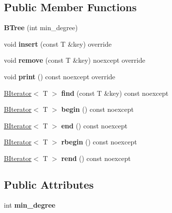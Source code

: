 \subsection*{Public Member Functions}
\begin{DoxyCompactItemize}
\item 
\mbox{\label{classBTree_a16c152bc0c234a02359d259c5dd1d959}} 
{\bfseries B\+Tree} (int min\+\_\+degree)
\item 
\mbox{\label{classBTree_a6b821651c388e302d1fb43551bb67232}} 
void {\bfseries insert} (const T \&key) override
\item 
\mbox{\label{classBTree_aef3581a1c5e11ac1c037d66a27cbcb94}} 
void {\bfseries remove} (const T \&key) noexcept override
\item 
\mbox{\label{classBTree_a4f31693f9077aad3266b7f13625b9ede}} 
void {\bfseries print} () const noexcept override
\item 
\mbox{\label{classBTree_ac0fac7271e38a543aff042db79be9c36}} 
\hyperlink{classBIterator}{B\+Iterator}$<$ T $>$ {\bfseries find} (const T \&key) const noexcept
\item 
\mbox{\label{classBTree_aae48f3719f14f2170641cf204a9d531c}} 
\hyperlink{classBIterator}{B\+Iterator}$<$ T $>$ {\bfseries begin} () const noexcept
\item 
\mbox{\label{classBTree_a3115f4378da1a0fd49e73a5dbecf9822}} 
\hyperlink{classBIterator}{B\+Iterator}$<$ T $>$ {\bfseries end} () const noexcept
\item 
\mbox{\label{classBTree_a3a24bc55b80013d9fcd57d5589aad413}} 
\hyperlink{classBIterator}{B\+Iterator}$<$ T $>$ {\bfseries rbegin} () const noexcept
\item 
\mbox{\label{classBTree_af024f4b5201a49115da494161d4dcbce}} 
\hyperlink{classBIterator}{B\+Iterator}$<$ T $>$ {\bfseries rend} () const noexcept
\end{DoxyCompactItemize}
\subsection*{Public Attributes}
\begin{DoxyCompactItemize}
\item 
\mbox{\label{classBTree_a67674b9ddf809c4f518185888f0918e4}} 
int {\bfseries min\+\_\+degree}
\end{DoxyCompactItemize}


